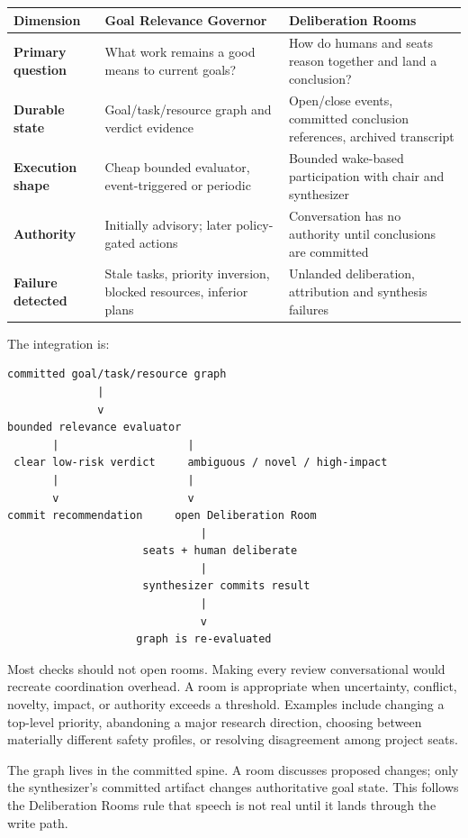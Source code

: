 \documentclass[11pt,letterpaper]{article}
\begin{document}
\begin{center}
\begin{tabularx}{\textwidth}{>{\bfseries}p{}XX}
\toprule
Dimension & Goal Relevance Governor & Deliberation Rooms \\
\midrule
Primary question & What work remains a good means to current goals? & How do
humans and seats reason together and land a conclusion? \\
Durable state & Goal/task/resource graph and verdict evidence & Open/close
events, committed conclusion references, archived transcript \\
Execution shape & Cheap bounded evaluator, event-triggered or periodic &
Bounded wake-based participation with chair and synthesizer \\
Authority & Initially advisory; later policy-gated actions & Conversation has
no authority until conclusions are committed \\
Failure detected & Stale tasks, priority inversion, blocked resources,
inferior plans & Unlanded deliberation, attribution and synthesis failures \\
\bottomrule
\end{tabularx}
\end{center}

The integration is:

\begin{lstlisting}[style=plain]
committed goal/task/resource graph
              |
              v
bounded relevance evaluator
       |                    |
 clear low-risk verdict     ambiguous / novel / high-impact
       |                    |
       v                    v
commit recommendation     open Deliberation Room
                              |
                     seats + human deliberate
                              |
                     synthesizer commits result
                              |
                              v
                    graph is re-evaluated
\end{lstlisting}

Most checks should not open rooms. Making every review conversational would
recreate coordination overhead. A room is appropriate when uncertainty,
conflict, novelty, impact, or authority exceeds a threshold. Examples include
changing a top-level priority, abandoning a major research direction, choosing
between materially different safety profiles, or resolving disagreement among
project seats.

The graph lives in the committed spine. A room discusses proposed changes;
only the synthesizer's committed artifact changes authoritative goal state.
This follows the Deliberation Rooms rule that speech is not real until it lands
through the write path.
\end{document}
